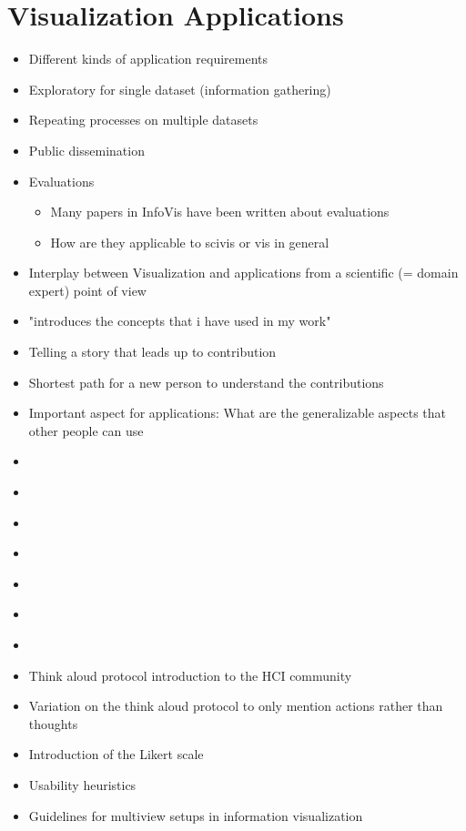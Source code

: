 \chapter{Visualization Applications}
\label{cha:visapp}

\begin{itemize}
\item Different kinds of application requirements
\item Exploratory for single dataset (information gathering)
\item Repeating processes on multiple datasets
\item Public dissemination
\item Evaluations
\begin{itemize}
    \item Many papers in InfoVis have been written about evaluations
    \item How are they applicable to scivis or vis in general
\end{itemize}
\item Interplay between Visualization and applications from a scientific (= domain expert) point of view
\item "introduces the concepts that i have used in my work"
\item Telling a story that leads up to contribution 
\item Shortest path for a new person to understand the contributions
\item Important aspect for applications: What are the generalizable aspects that other people can use

\end{itemize}

\begin{itemize}
\item \cite{tory2005evaluating}
\item \cite{munzner2009nested}
\item \cite{tory2004human}
\item \cite{kirby2013visualization}
\item \cite{van2006bridging}
\item \cite{kosara2003thoughts}
\item \cite{carpendale2008evaluating}
\item \cite{lewis1993task} Think aloud protocol introduction to the HCI community
\item \cite{ericsson1980verbal} Variation on the think aloud protocol to only mention actions rather than thoughts
\item \cite{likert1932technique} Introduction of the Likert scale
\item \cite{nielsen1994heuristic} Usability heuristics
\item \cite{wang2000guidelines} Guidelines for multiview setups in information visualization
\end{itemize}

